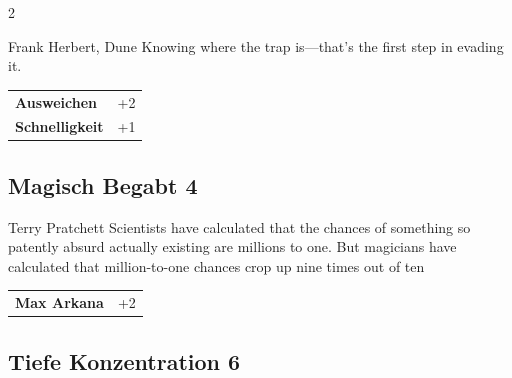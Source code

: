\begin{multicols}{2}
\begin{tcolorbox}
\begin{pquote}{Frank Herbert, Dune}
Knowing where the trap is—that's the first step in evading it.
\end{pquote}

\vspace{3mm}

\begin{tabular}{@{}ll@{}}
    \textbf{Ausweichen} & +2\\
    \textbf{Schnelligkeit} & +1\\
\end{tabular}


\end{tcolorbox}

\begin{tcolorbox}
    \subsection*{Magisch Begabt \hfill \small{4 }}
    \tcblower


\begin{pquote}{Terry Pratchett}
Scientists have calculated that the chances of something so patently absurd actually existing are millions to one. But magicians have calculated that million-to-one chances crop up nine times out of ten
\end{pquote}

\vspace{3mm}

\begin{tabular}{@{}ll@{}}
    \textbf{Max Arkana} & +2\\
\end{tabular}


\end{tcolorbox}

\begin{tcolorbox}
    \subsection*{Tiefe Konzentration \hfill \small{6 }}
    \tcblower





\end{tcolorbox}
\end{multicols}
